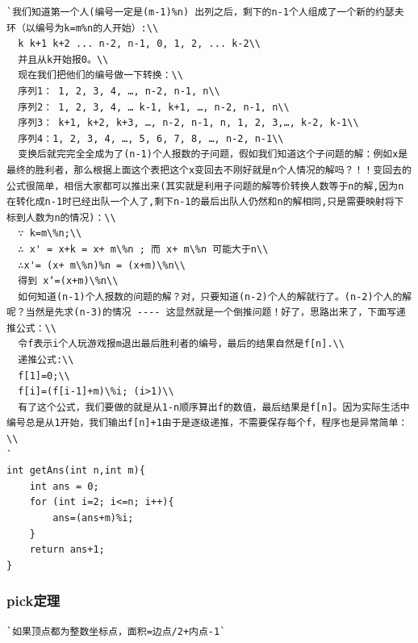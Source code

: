 \documentclass[a4paper]{article}
\begin{document}
\begin{CJK*}{UTF8}{gbsn}
\begin{multicols}{3}
\begin{flushleft}
\begin{lstlisting}
`我们知道第一个人(编号一定是(m-1)%n) 出列之后，剩下的n-1个人组成了一个新的约瑟夫环（以编号为k=m%n的人开始）:\\
  k k+1 k+2 ... n-2, n-1, 0, 1, 2, ... k-2\\
  并且从k开始报0。\\
  现在我们把他们的编号做一下转换：\\
  序列1： 1, 2, 3, 4, …, n-2, n-1, n\\
  序列2： 1, 2, 3, 4, … k-1, k+1, …, n-2, n-1, n\\
  序列3： k+1, k+2, k+3, …, n-2, n-1, n, 1, 2, 3,…, k-2, k-1\\
  序列4：1, 2, 3, 4, …, 5, 6, 7, 8, …, n-2, n-1\\
  变换后就完完全全成为了(n-1)个人报数的子问题，假如我们知道这个子问题的解：例如x是最终的胜利者，那么根据上面这个表把这个x变回去不刚好就是n个人情况的解吗？！！变回去的公式很简单，相信大家都可以推出来(其实就是利用子问题的解等价转换人数等于n的解,因为n在转化成n-1时已经出队一个人了,剩下n-1的最后出队人仍然和n的解相同,只是需要映射将下标到人数为n的情况)：\\
  ∵ k=m\%n;\\
  ∴ x' = x+k = x+ m\%n ; 而 x+ m\%n 可能大于n\\
  ∴x'= (x+ m\%n)%n = (x+m)\%n\\
  得到 x‘=(x+m)\%n\\
  如何知道(n-1)个人报数的问题的解？对，只要知道(n-2)个人的解就行了。(n-2)个人的解呢？当然是先求(n-3)的情况 ---- 这显然就是一个倒推问题！好了，思路出来了，下面写递推公式：\\
  令f表示i个人玩游戏报m退出最后胜利者的编号，最后的结果自然是f[n].\\
  递推公式:\\
  f[1]=0;\\
  f[i]=(f[i-1]+m)\%i; (i>1)\\
  有了这个公式，我们要做的就是从1-n顺序算出f的数值，最后结果是f[n]。因为实际生活中编号总是从1开始，我们输出f[n]+1由于是逐级递推，不需要保存每个f，程序也是异常简单：\\
`
int getAns(int n,int m){
    int ans = 0;
    for (int i=2; i<=n; i++){
        ans=(ans+m)%i;
    }
    return ans+1;
}
\end{lstlisting}

\subsubsection{pick定理}
\begin{lstlisting}
`如果顶点都为整数坐标点，面积=边点/2+内点-1`
\end{lstlisting}


\end{flushleft}
\end{multicols}
\end{CJK*}
\end{document}
